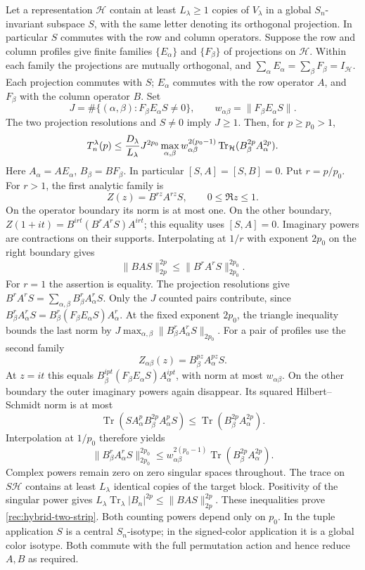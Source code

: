 Let a representation $\mathcal H$ contain at least $L_\lambda\ge1$ copies of
$V_\lambda$ in a global $S_n$-invariant subspace $S$, with the same letter denoting its orthogonal projection. In particular $S$ commutes with the row and column operators. Suppose the row and column
profiles give finite families $\{E_\alpha\}$ and $\{F_\beta\}$ of
projections on $\mathcal H$. Within each family the projections are
mutually orthogonal, and
$\sum_\alpha E_\alpha=\sum_\beta F_\beta=I_{\mathcal H}$.
Each projection commutes with $S$; $E_\alpha$ commutes with the row
operator $A$, and $F_\beta$ with the column operator $B$. Set
\[
 J=\#\{(\alpha,\beta):F_\beta E_\alpha S\ne0\},\qquad
 w_{\alpha\beta}=\|F_\beta E_\alpha S\|.
\]
The two projection resolutions and $S\ne0$ imply $J\ge1$.
Then, for $p\ge p_0>1$,
\begin{equation}\label{rec:hybrid-two-strip}
 T_n^\lambda(p)\le
 \frac{D_\lambda}{L_\lambda}J^{2p_0}
 \max_{\alpha,\beta}
 w_{\alpha\beta}^{2(p_0-1)}
 \operatorname{Tr}_{\mathcal H}(B_\beta^{2p}A_\alpha^{2p}).
\end{equation}
Here $A_\alpha=AE_\alpha$,
$B_\beta=BF_\beta$. In particular $[S,A]=[S,B]=0$.
Put $r=p/p_0$. For $r>1$, the first analytic family is
\[
 Z(z)=B^{rz}A^{rz}S,\qquad0\le\Re z\le1.
\]
On the operator boundary its norm is at most one. On the other
boundary,
$Z(1+it)=B^{irt}(B^rA^rS)A^{irt}$; this equality uses $[S,A]=0$.
Imaginary powers are contractions on their supports. Interpolating
at $1/r$ with exponent $2p_0$ on the right boundary gives
\[
 \|BAS\|_{2p}^{2p}\le\|B^rA^rS\|_{2p_0}^{2p_0}.
\]
For $r=1$ the assertion is equality. The projection resolutions give
$B^rA^rS=\sum_{\alpha,\beta}B_\beta^rA_\alpha^rS$.
Only the $J$ counted pairs contribute, since
$B_\beta^rA_\alpha^rS=B_\beta^r(F_\beta E_\alpha S)A_\alpha^r$.
At the fixed exponent $2p_0$, the triangle inequality bounds the last norm by
$J\max_{\alpha,\beta}\|B_\beta^rA_\alpha^rS\|_{2p_0}$.
For a pair of profiles use the second family
\[
 Z_{\alpha\beta}(z)=B_\beta^{pz}A_\alpha^{pz}S.
\]
At $z=it$ this equals
$B_\beta^{ipt}(F_\beta E_\alpha S)A_\alpha^{ipt}$, with norm at most
$w_{\alpha\beta}$. On the other boundary the outer imaginary powers
again disappear. Its squared Hilbert--Schmidt norm is at most
\[
 \operatorname{Tr}(S A_\alpha^pB_\beta^{2p}A_\alpha^pS)
 \le\operatorname{Tr}(B_\beta^{2p}A_\alpha^{2p}).
\]
Interpolation at $1/p_0$ therefore yields
\[
 \|B_\beta^rA_\alpha^rS\|_{2p_0}^{2p_0}
 \le w_{\alpha\beta}^{2(p_0-1)}
       \operatorname{Tr}(B_\beta^{2p}A_\alpha^{2p}).
\]
Complex powers remain zero on zero singular spaces throughout.
The trace on $S\mathcal H$ contains at least $L_\lambda$ identical
copies of the target block. Positivity of the singular power gives
$L_\lambda\operatorname{Tr}_\lambda|B_n|^{2p}
\le\|BAS\|_{2p}^{2p}$. These inequalities prove
\eqref{rec:hybrid-two-strip}. Both counting powers depend only on
$p_0$. In the tuple application $S$ is a central $S_n$-isotype;
in the signed-color application it is a global color isotype.
Both commute with the full permutation action and hence reduce
$A,B$ as required.

